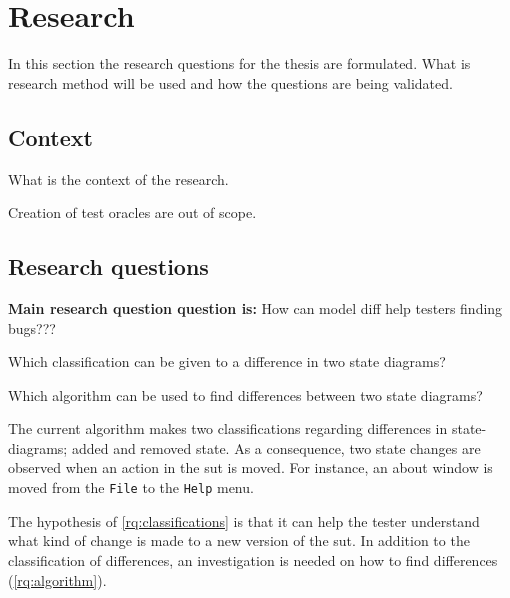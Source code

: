 \section{Research} \label{questions}
    In this section the research questions for the thesis are formulated. What is research method will be used and how the questions are being validated.

    \subsection{Context}
    What is the context of the research. 
    
    Creation of test oracles are out of scope.

    \subsection{Research questions}
        
        \textbf{Main research question question is:} How can model diff help testers finding bugs???
        
        
        \begin{questions}
            \item Which classification can be given to a difference in two state diagrams? \label{rq:classifications} 
            \begin{questions}
                \item Which algorithm can be used to find differences between two state diagrams? \label{rq:algorithm}    
            \end{questions}
        \end{questions}
        
        The current algorithm \cite{stateDiff} makes two classifications regarding differences in state-diagrams; added and removed state. As a consequence, two state changes are observed when an action in the \acrshort{sut} is moved. For instance, an about window is moved from the \verb|File| to the \verb|Help| menu. 
        
        The hypothesis of \ref{rq:classifications} is that it can help the tester understand what kind of change is made to a new version of the \acrshort{sut}. In addition to the classification of differences, an investigation is needed on how to find differences (\ref{rq:algorithm}).
        
